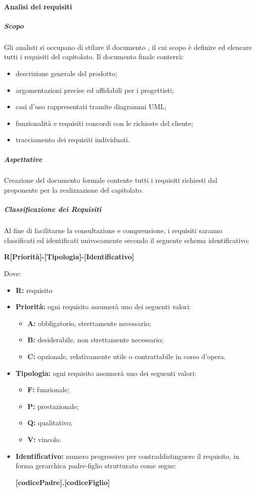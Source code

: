 			\paragraph{Analisi dei requisiti}
				\subparagraph{Scopo}
					Gli analisti si occupano di stilare il documento , il cui scopo è definire ed elencare tutti i requisiti del capitolato. Il documento finale conterrà:
					\begin{itemize}
						\item descrizione generale del prodotto;
						\item argomentazioni precise ed affidabili per i progettisti;
						\item casi d'uso rappresentati tramite diagrammi UML;
						\item funzionalità e requisiti concordi con le richieste del cliente;
						\item tracciamento dei requisiti individuati. 
					\end{itemize}
				\subparagraph{Aspettative}
					Creazione del documento formale contente tutti i requisiti richiesti dal proponente per la realizzazione del capitolato.
				\subparagraph{Classificazione dei Requisiti}
					Al fine di facilitarne la consultazione e comprensione, i requisiti saranno classificati ed identificati univocamente secondo il seguente schema identificativo:
					\begin{center}
						\textbf{R[Priorità]-[Tipologia]-[Identificativo]}
					\end{center}
					Dove:
					\begin{itemize}
						\item \textbf{R:} requisito 
						\item \textbf{Priorità:} ogni requisito assumerà uno dei seguenti valori:
						\begin{itemize}
							\item \textbf{A:} obbligatorio, strettamente necessario;
							\item \textbf{B:} desiderabile, non strettamente necessario;
							\item \textbf{C:} opzionale, relativamente utile o contrattabile in corso d'opera.
						\end{itemize}
						\item \textbf{Tipologia:} ogni requisito assumerà uno dei seguenti valori:
						\begin{itemize}
							\item \textbf{F:} funzionale;
							\item \textbf{P:} prestazionale;
							\item \textbf{Q:} qualitativo;
							\item \textbf{V:} vincolo.
						\end{itemize}
						\item \textbf{Identificativo:} numero progressivo per contraddistinguere il requisito, in forma gerarchica padre-figlio strutturato come segue: 
						\begin{center}
							\textbf{[codicePadre].[codiceFiglio]}
						\end{center}
					\end{itemize}
